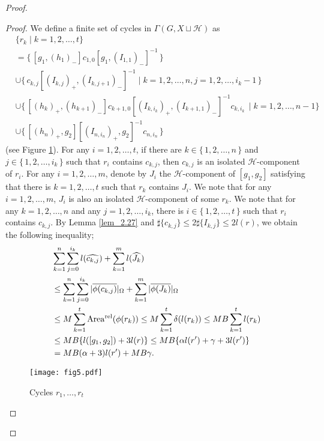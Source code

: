 \documentclass{amsart}
\theoremstyle{definition}
\begin{document}
\begin{proof}
\begin{proof}
We define a finite set of cycles in $\Gamma(G,X\sqcup {\mathcal H})$ as 
\begin{equation*}
\begin{split}
&\{r_k \mid k=1,2,\ldots,t\}\\
&=\{\,[g_1,(h_1)_-]c_{1,0}[g_1,(I_{1,1})_-]^{-1}\,\}\\
&\cup\{\,c_{k,j}[(I_{k,j})_+,(I_{k,j+1})_-]^{-1} \mid k=1,2,\ldots,n, j=1,2,\ldots,i_k-1\,\} \\
&\cup \{\,[(h_k)_+,(h_{k+1})_-]c_{k+1,0}[(I_{k,i_k})_+,(I_{k+1,1})_-]^{-1}c_{k,i_k}\,\mid k=1,2,\ldots,n-1\}\\
&\cup\{\,[(h_n)_+,g_2][(I_{n,i_n})_+,g_2]^{-1}c_{n,i_n}\,\}
\end{split}
\end{equation*}
(see Figure \ref{fig5}). 
For any $i=1,2,\ldots,t$, if there are $k\in\{\,1,2,\ldots,n\,\}$ and $j\in\{\,1,2,\ldots,i_k\,\}$ such that $r_i$ contains $c_{k,j}$, then $c_{k,j}$ is an isolated ${\mathcal H}$-component of $r_i$. 
For any $i=1,2,\ldots,m$, denote by $J_i$ the ${\mathcal H}$-component of $[g_1,g_2]$ satisfying that there is $k=1,2,\ldots,t$ such that $r_k$ contains $J_i$. 
We note that for any $i=1,2,\ldots,m$, $J_i$ is also an isolated ${\mathcal H}$-component of some $r_k$. 
We note that for any $k=1,2,\ldots,n$ and any $j=1,2,\ldots,i_k$, there is $i\in \{\,1,2,\ldots,t\,\}$ such that $r_i$ contains $c_{k,j}$. 
By Lemma \ref{lem_2.27} and $\sharp\{c_{k , j}\}\leq 2 \sharp \{I_{k,j}\}\leq 2 l(r)$, we obtain the following inequality;
\begin{equation*}
\begin{split}
&\sum_{k=1}^n \sum_{j=0}^{i_k} l(\widehat{c_{k,j}})+\sum_{k=1}^m l(\widehat{J_k})\\
&\le \sum_{k=1}^n \sum_{j=0}^{i_k}|\overline{\phi(c_{k,j})}|_{\Omega}+\sum_{k=1}^m|\overline{\phi(J_k)}|_{\Omega}\\
&\le M\sum_{k=1}^t {{\rm Area^{rel}}}(\phi(r_k))
\le M\sum_{k=1}^t \delta(l(r_k))
\le MB\sum_{k=1}^t l(r_k)\\
&\le MB \{l([g_1,g_2])+3l(r)\}\le MB\{\alpha l(r')+\gamma+3l(r')\}\\
&=MB(\alpha+3)l(r')+MB\gamma.
\end{split}
\end{equation*}

\begin{figure}[top]
\begin{center}
\texttt{[image: fig5.pdf]}
\end{center}
\caption{Cycles $r_1, \ldots,r_t$}
\label{fig5}
\end{figure}


\end{proof}
\end{proof}
\end{document}
